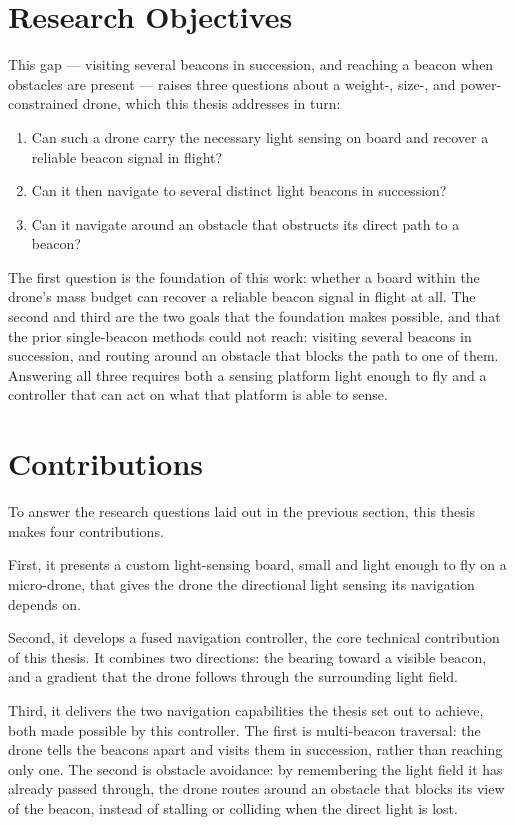 \section{Research Objectives}

This gap --- visiting several beacons in succession, and reaching a beacon when obstacles are present --- raises three questions about a weight-, size-, and power-constrained drone, which this thesis addresses in turn:

\begin{enumerate}
    \item \label{rq:feasibility} Can such a drone carry the necessary light sensing on board and recover a reliable beacon signal in flight?
    \item \label{rq:multibeacon} Can it then navigate to several distinct light beacons in succession?
    \item \label{rq:obstacle} Can it navigate around an obstacle that obstructs its direct path to a beacon?
\end{enumerate}

The first question is the foundation of this work: whether a board within the drone's mass budget can recover a reliable beacon signal in flight at all. The second and third are the two goals that the foundation makes possible, and that the prior single-beacon methods could not reach: visiting several beacons in succession, and routing around an obstacle that blocks the path to one of them. Answering all three requires both a sensing platform light enough to fly and a controller that can act on what that platform is able to sense.

\section{Contributions}

To answer the research questions laid out in the previous section, this thesis makes four contributions.

First, it presents a custom light-sensing board, small and light enough to fly on a micro-drone, that gives the drone the directional light sensing its navigation depends on.

Second, it develops a fused navigation controller, the core technical contribution of this thesis. It combines two directions: the bearing toward a visible beacon, and a gradient that the drone follows through the surrounding light field.

Third, it delivers the two navigation capabilities the thesis set out to achieve, both made possible by this controller. The first is multi-beacon traversal: the drone tells the beacons apart and visits them in succession, rather than reaching only one. The second is obstacle avoidance: by remembering the light field it has already passed through, the drone routes around an obstacle that blocks its view of the beacon, instead of stalling or colliding when the direct light is lost.

